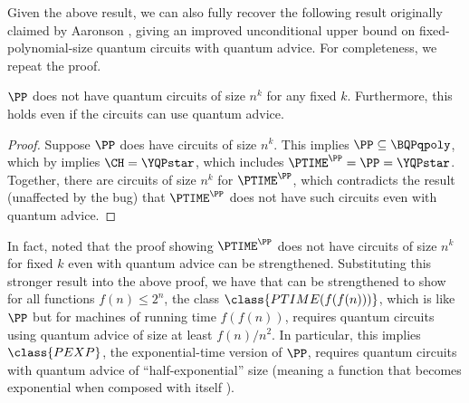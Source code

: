 Given the above result, we can also fully recover the following result originally
claimed by Aaronson \cite{aaronson_subtle}, giving an improved unconditional upper bound
on %
fixed-polynomial-size  %
quantum circuits with quantum advice.
For completeness, we repeat the proof.

\begin{theorem}\label{thm:PPcircs}
	$\PP$ does not have quantum circuits of size $n^k$ for any fixed $k$.
	Furthermore, this holds even if the circuits can use quantum advice.
\end{theorem}
\begin{proof}
	Suppose $\PP$ does have circuits of size $n^k$.
	This implies $\PP\subseteq \BQPqpoly$, which by  implies
	$\CH = \YQPstar$, which includes
	$\PTIME^\PP = \PP = \YQPstar$.
	Together, there are circuits of size $n^k$ for $\PTIME^\PP$, which contradicts
	the result \cite[Theorem 4]{aaronson_subtle} (unaffected by the bug)
	that $\PTIME^\PP$ does not have such circuits even with quantum advice.
\end{proof}

In fact, \cite{aaronson_subtle} noted
that the proof showing
$\PTIME^\PP$ does not have circuits of size $n^k$ for fixed $k$
even with quantum advice can be strengthened.
Substituting this stronger result into the above proof,
we have that  can be strengthened to show for all functions
$f(n)\leq 2^n$,
the class $\class{PTIME(f(f(n)))}$,
which is like $\PP$ but for machines of running time $f(f(n))$,
requires quantum circuits using quantum advice of size at least $f(n)/n^2$.
In particular, this implies $\class{PEXP}$, the exponential-time version of $\PP$,
requires quantum circuits with quantum advice of ``half-exponential'' size (meaning
a function that becomes exponential when composed with itself \cite{miltersen1999super}).



%
%


